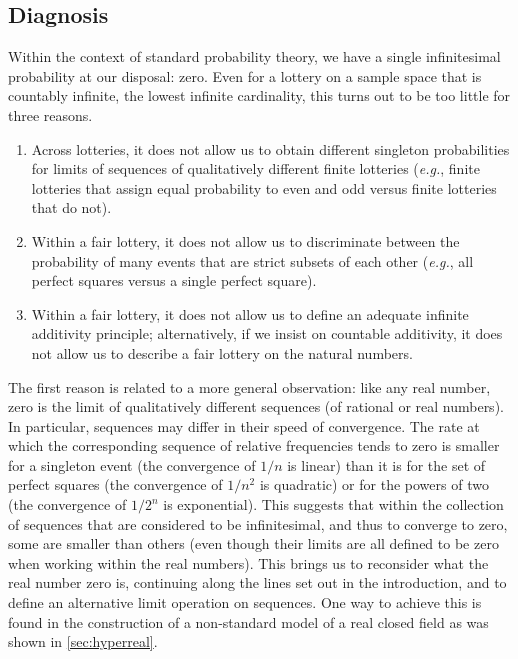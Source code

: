 \subsection{Diagnosis}
Within the context of standard probability theory, we have a single infinitesimal probability at our disposal: zero. Even for a lottery on a sample space that is countably infinite, the lowest infinite cardinality, this turns out to be too little for three reasons.
\begin{enumerate}
  \item Across lotteries, it does not allow us to obtain different singleton probabilities for limits of sequences of qualitatively different finite lotteries (\textit{e.g.}, finite lotteries that assign equal probability to even and odd versus finite lotteries that do not).
  \item Within a fair lottery, it does not allow us to discriminate between the probability of many events that are strict subsets of each other (\textit{e.g.}, all perfect squares versus a single perfect square).
  \item Within a fair lottery, it does not allow us to define an adequate infinite additivity principle; alternatively, if we insist on countable additivity, it does not allow us to describe a fair lottery on the natural numbers.
\end{enumerate}

The first reason is related to a more general observation: like any real number, zero is the limit of qualitatively different sequences (of rational or real numbers). In particular, sequences may differ in their speed of convergence. The rate at which the corresponding sequence of relative frequencies tends to zero is smaller for a singleton event (the convergence of $1/n$ is linear) than it is for the set of perfect squares (the convergence of $1/n^2$ is quadratic) or for the powers of two (the convergence of  $1/2^n$ is exponential). This suggests that within the collection of sequences that are considered to be infinitesimal, and thus to converge to zero, some are smaller than others (even though their limits are all defined to be zero when working within the real numbers).
This brings us to reconsider what the real number zero is, continuing along the lines set out in the introduction, and to define an alternative limit operation on sequences. One way to achieve this is found in the construction of a non-standard model of a real closed field as was shown in \autoref{sec:hyperreal}.

